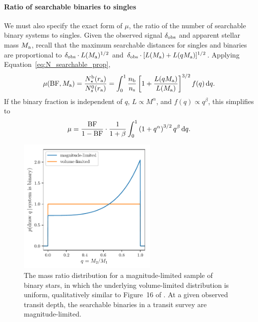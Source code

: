 \documentclass[12pt,modern]{aastex61}
\renewcommand{\a}{_{\rm a}}
\begin{document}
\paragraph{Ratio of searchable binaries to singles}

We must also specify the exact form of $\mu$, the ratio of the number
of searchable binary systems to singles.  Given the observed signal
$\delta_{\rm obs}$ and apparent stellar mass $M\a$, recall that the
maximum searchable distances for singles and binaries are proportional
to $\delta_{\rm obs}\cdot L(M\a)^{1/2}$ and $\delta_{\rm obs}\cdot
[L(M\a)+L(qM\a)]^{1/2}$.  Applying
Equation~\ref{eq:N_searchable_prop},
\begin{equation}
    \mu({\rm BF},M\a)
    = 
    \frac{N_\star^{\rm b}(r\a)}{N_s^0(r\a)}
    =
    \int_0^1 {n_{\rm b}\over n_{\rm s}}\left[1+{L(qM\a) \over
        L(M\a)}\right]^{3/2} f(q)\,\mathrm{d}q.
    \label{eq:mu_general}
\end{equation}
If the binary fraction is independent of $q$, $L \propto M^\alpha$,
and $f(q) \propto q^\beta$, this simplifies to
\begin{equation}
    \mu =\frac{{\rm BF}}{1 - {\rm BF}}\cdot {1\over{1+\beta}}\int_0^1
    \left(1+q^\alpha\right)^{3/2} q^\beta \,\mathrm{d}q.
    \label{eq:mu_power_laws}
\end{equation}
\begin{figure}[!tb]
    \centering
    \includegraphics[width=0.6\textwidth]{figures/mass_ratio_distribution.pdf}
    \caption{
        The mass ratio distribution for a magnitude-limited sample of
        binary stars, in which the underlying volume-limited
        distribution is uniform, qualitatively similar to Figure~16 of
        \citet{raghavan_survey_2010}.  At a given observed transit
        depth, the searchable binaries in a transit survey are
        magnitude-limited.
    }
    \label{fig:q_distribn_mag_limited}
\end{figure}
\end{document}
